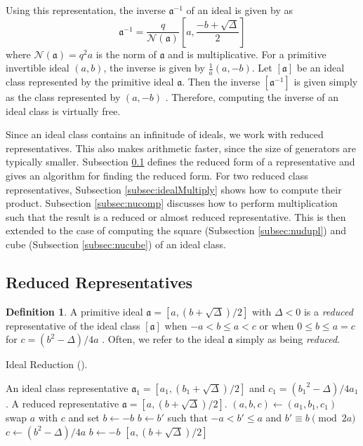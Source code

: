 \documentclass{ucalgthes1}
\theoremstyle{definition}
\newtheorem{defn}[thm]{Definition}
\newcommand{\ideal}{\mathfrak}
\newcommand{\idealclass}[1]{\left[ \ideal #1 \right]}
\newcommand{\aclass}{\idealclass a}
\begin{document}
Using this representation, the inverse $\ideal a^{-1}$ of an ideal is given by \cite[pp.14--15]{Jacobson1999} as
\begin{equation}
\label{eq:idealInverse}
	{\ideal a}^{-1} = \frac{q}{\mathcal N(\mathfrak a)} \left[a, \frac{-b+\sqrt{\Delta}}{2} \right]
\end{equation}
where $\mathcal N(\ideal a) = q^2a$ is the norm of $\ideal a$ and is multiplicative.  For a primitive invertible ideal $(a, b)$, the inverse is given by $\frac{1}{a}(a, -b)$.  Let $\aclass$ be an ideal class represented by the primitive ideal $\ideal a$.  Then the inverse $\idealclass{a^{-1}}$ is given simply as the class represented by $(a, -b)$ \cite[p.20]{Ramachandran2006}.  Therefore, computing the inverse of an ideal class is virtually free. 

Since an ideal class contains an infinitude of ideals, we work with reduced representatives.  This also makes arithmetic faster, since the size of generators are typically smaller.  Subsection \ref{subsec:reduction} defines the reduced form of a representative and gives an algorithm for finding the reduced form.  For two reduced class representatives, Subsection \ref{subsec:idealMultiply} shows how to compute their product.  Subsection \ref{subsec:nucomp} discusses how to perform multiplication such that the result is a reduced or almost reduced representative.  This is then extended to the case of computing the square (Subsection \ref{subsec:nudupl}) and cube (Subsection \ref{subsec:nucube}) of an ideal class.  

\subsection{Reduced Representatives}
\label{subsec:reduction}

\begin{defn}
\label{defn:reducedIdeal}
A primitive ideal $\ideal a = [a, (b+\sqrt{\Delta})/2]$ with $\Delta < 0$ is a \emph{reduced} representative of the ideal class $\aclass$ when $-a < b \le a < c$ or when $0 \le b \le a = c$ for $c = (b^2 - \Delta)/4a$ \cite[p.241]{Crandall2001}.  Often, we refer to the ideal $\ideal a$ simply as being \emph{reduced}.
\end{defn}

\begin{algorithm}[htb]
\caption{Ideal Reduction (\cite[p.90]{Jacobson2006}).}
\label{alg:reduce}
\begin{algorithmic}[1]
\Require An ideal class representative $\ideal a_1 = [a_1, (b_1+\sqrt\Delta)/2]$ and $c_1 = ({b_1}^2 - \Delta)/4a_1$.
\Ensure A reduced representative $\ideal a = [a, (b+\sqrt\Delta)/2]$.
\State $(a, b, c) \gets (a_1, b_1, c_1)$
		\State swap $a$ with $c$ and set $b \gets -b$
	\EndIf
		\State $b \gets b'$ such that $-a < b' \le a$ and $b' \equiv b \pmod{2a}$
		\State $c \gets (b^2-\Delta)/4a$
	\EndIf
\EndWhile
{}
	\State $b \gets -b$
\EndIf
\State \Return $[a, (b+\sqrt\Delta)/2]$
\end{algorithmic}
\end{algorithm}
\end{document}
